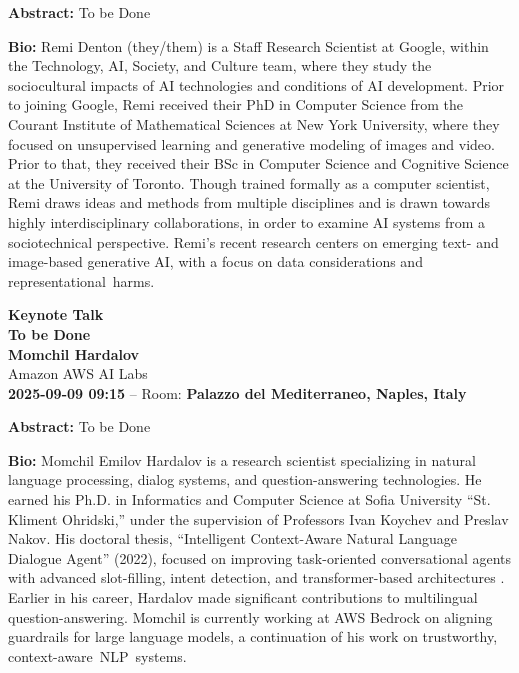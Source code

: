 \documentclass[11pt,oneside]{book}
\begin{document}
  \vspace*{0.2cm}
    \textbf{Abstract:} To be Done\\
  \newline
  
    \textbf{Bio:} Remi Denton (they/them) is a Staff Research Scientist at Google, within the Technology, AI, Society, and Culture team, where they study the sociocultural impacts of AI technologies and conditions of AI development. Prior to joining Google, Remi received their PhD in Computer Science from the Courant Institute of Mathematical Sciences at New York University, where they focused on unsupervised learning and generative modeling of images and video. Prior to that, they received their BSc in Computer Science and Cognitive Science at the University of Toronto. Though trained formally as a computer scientist, Remi draws ideas and methods from multiple disciplines and is drawn towards highly interdisciplinary collaborations, in order to examine AI systems from a sociotechnical perspective.  Remi’s recent research centers on emerging text- and image-based generative AI, with a focus on data considerations and representational harms.
  \newpage
  \begin{center}
          {\Large \textbf{Keynote Talk}\\}
      {\LARGE \textbf{To be Done}\\}
        \vspace*{0.5cm}
    \textbf{Momchil Hardalov}\\
        Amazon AWS AI Labs\\
        
        
        \textbf{2025-09-09 09:15} -- 
                Room: \textbf{Palazzo del Mediterraneo, Naples, Italy}\\
        
  \end{center}

  \vspace*{0.2cm}
    \textbf{Abstract:} To be Done\\
  \newline
  
    \textbf{Bio:} Momchil Emilov Hardalov is a research scientist specializing in natural language processing, dialog systems, and question-answering technologies. He earned his Ph.D. in Informatics and Computer Science at Sofia University “St. Kliment Ohridski,” under the supervision of Professors Ivan Koychev and Preslav Nakov. His doctoral thesis, “Intelligent Context-Aware Natural Language Dialogue Agent” (2022), focused on improving task-oriented conversational agents with advanced slot-filling, intent detection, and transformer-based architectures . Earlier in his career, Hardalov made significant contributions to multilingual question-answering. Momchil is currently working at AWS Bedrock on aligning guardrails for large language models, a continuation of his work on trustworthy, context-aware NLP systems.
  \newpage
  
\end{document}
